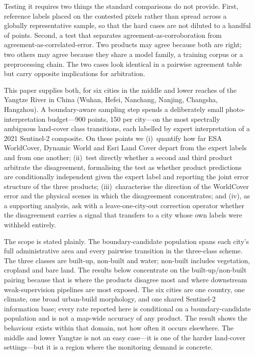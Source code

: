 \documentclass[remotesensing,article,submit,moreauthors]{Definitions/mdpi}
\begin{document}
Testing it requires two things the standard comparisons do not provide. First,
reference labels placed on the contested pixels rather than spread across a
globally representative sample, so that the hard cases are not diluted to a
handful of points. Second, a test that separates agreement-as-corroboration
from agreement-as-correlated-error. Two products may agree because both are
right; two others may agree because they share a model family, a training
corpus or a preprocessing chain. The two cases look identical in a pairwise
agreement table but carry opposite implications for arbitration.

This paper supplies both, for six cities in the middle and lower reaches of the Yangtze River in China
(Wuhan, Hefei, Nanchang, Nanjing, Changsha, Hangzhou). A boundary-aware
sampling step spends a deliberately small photo-interpretation budget---900
points, 150 per city---on the most spectrally ambiguous land-cover class
transitions, each labelled by expert interpretation of a 2021 Sentinel-2
composite. On these points we (i)~quantify how far ESA WorldCover, Dynamic
World and Esri Land Cover depart from the expert labels and from one another;
(ii)~test directly whether a second and third product arbitrate the
disagreement, formalising the test as whether product predictions are
conditionally independent given the expert label and reporting the joint error
structure of the three
products; (iii)~characterise the direction of the WorldCover error and the
physical scenes in which the disagreement concentrates; and (iv), as a
supporting analysis, ask with a leave-one-city-out correction operator whether
the disagreement carries a signal that transfers to a city whose own labels
were withheld entirely.

The scope is stated plainly. The boundary-candidate population spans each
city's full administrative area and every pairwise transition in the
three-class scheme. The three classes are built-up, non-built and water;
non-built includes vegetation, cropland and bare land. The results
below concentrate on the built-up/non-built pairing because that is where the
products disagree most and where downstream weak-supervision pipelines are
most exposed. The six cities are one country, one climate, one
broad urban-build morphology, and one shared Sentinel-2 information base;
every rate reported here is
conditional on a boundary-candidate population and is not a map-wide accuracy
of any product. The result shows the behaviour exists within that domain,
not how often it occurs elsewhere. The middle and
lower Yangtze is not an easy case---it is one of the harder land-cover settings---but it is
a region where the monitoring demand is concrete.
\end{document}
